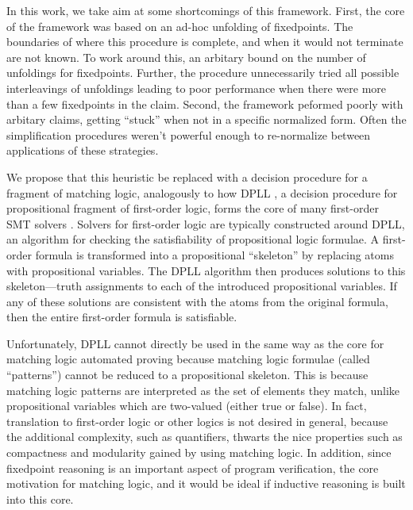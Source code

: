 In this work, we take aim at some shortcomings of this framework.
First, the core of the framework was based on an ad-hoc unfolding of fixedpoints.
The boundaries of where this procedure is complete, and when it would not terminate are not known.
To work around this, an arbitary bound on the number of unfoldings for fixedpoints.
Further, the procedure unnecessarily tried all possible interleavings of unfoldings
leading to poor performance when there were more than a few fixedpoints in the claim.
Second, the framework peformed poorly with arbitary claims, getting ``stuck'' when not in a specific normalized form.
Often the simplification procedures weren't powerful enough to re-normalize between applications of these strategies.

We propose that this heuristic be replaced with a decision procedure for a fragment of matching logic,
analogously to how DPLL \cite{dpll,dpllt}, a decision procedure for propositional fragment of first-order logic,
forms the core of many first-order SMT solvers \cite{z3,mathsat4,cvc4}.
Solvers for first-order logic are typically constructed around DPLL,
an algorithm for checking the satisfiability of propositional logic formulae.
A first-order formula is transformed into a propositional ``skeleton'' by replacing atoms with propositional variables.
The DPLL algorithm then produces solutions to this skeleton---truth assignments to each of the introduced propositional variables.
If any of these solutions are consistent with the atoms from the original formula,
then the entire first-order formula is satisfiable.

Unfortunately, DPLL cannot directly be used in the same way as the core for matching logic automated proving
because matching logic formulae (called ``patterns'') cannot be reduced to a propositional skeleton.
This is because matching logic patterns are interpreted as the set of elements
they match, unlike propositional variables which are two-valued (either true or false).
In fact, translation to first-order logic or other logics is not desired in general,
because the additional complexity, such as quantifiers,
thwarts the nice properties such as compactness and modularity gained by using matching logic.
In addition, since fixedpoint reasoning is an important aspect of program verification,
the core motivation for matching logic,
and it would be ideal if inductive reasoning is built into this core.
\newline

